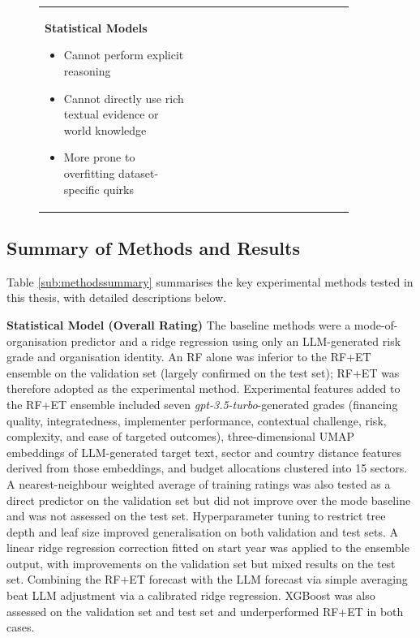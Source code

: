 \documentclass[12pt,a4paper]{article}
\begin{document}
\begin{figure}[!htbp]
\begin{tabular}{p{0.45\linewidth} p{0.45\linewidth}}
\textbf{Statistical Models}
\begin{itemize}[noitemsep,topsep=0pt]
  \item Cannot perform explicit reasoning
  \item Cannot directly use rich textual evidence or world knowledge
  \item More prone to overfitting dataset-specific quirks
\end{itemize}

\\
\end{tabular}
\label{fig:forecast_strengths_weaknesses}
\end{figure}

\FloatBarrier
\subsection{Summary of Methods and Results}

Table \ref{sub:methodssummary} summarises the key experimental methods tested in this thesis, with detailed descriptions below.

\textbf{Statistical Model (Overall Rating)}
The baseline methods were a mode-of-organisation predictor and a ridge regression using only an LLM-generated risk grade and organisation identity. An RF alone was inferior to the RF+ET ensemble on the validation set (largely confirmed on the test set); RF+ET was therefore adopted as the experimental method. Experimental features added to the RF+ET ensemble included seven \emph{gpt-3.5-turbo}-generated grades (financing quality, integratedness, implementer performance, contextual challenge, risk, complexity, and ease of targeted outcomes), three-dimensional UMAP embeddings of LLM-generated target text, sector and country distance features derived from those embeddings, and budget allocations clustered into 15 sectors. A nearest-neighbour weighted average of training ratings was also tested as a direct predictor on the validation set but did not improve over the mode baseline and was not assessed on the test set. Hyperparameter tuning to restrict tree depth and leaf size improved generalisation on both validation and test sets. A linear ridge regression correction fitted on start year was applied to the ensemble output, with improvements on the validation set but mixed results on the test set. Combining the RF+ET forecast with the LLM forecast via simple averaging beat LLM adjustment via a calibrated ridge regression. XGBoost was also assessed on the validation set and test set and underperformed RF+ET in both cases.
\end{document}
